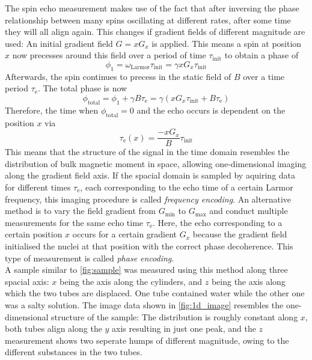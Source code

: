 \documentclass[
    parskip=half, 
    twoside=false,
    twocolumn=true,
    fontsize=11pt,
]{scrarticle}
\begin{document}
The spin echo measurement makes use of the fact that after inversing the phase relationship between many spins oscillating at different rates, after some time they will all align again. This changes if gradient fields of different magnitude are used: An initial gradient field $G = x G_x$ is applied. This means a spin at position $x$ now precesses around this field over a period of time $\tau_\text{init}$ to obtain a phase of
\begin{equation*}
 \phi_1 = \omega_\text{Larmor} \tau_\text{init} = \gamma x G_x \tau_\text{init}
\end{equation*}
Afterwards, the spin continues to precess in the static field of $B$ over a time period $\tau_\text{e}$. The total phase is now
\begin{equation*}
 \phi_\text{total} = \phi_1 + \gamma B \tau_\text{e} = \gamma (x G_x \tau_\text{init} + B \tau_\text{e})
\end{equation*}
Therefore, the time when $\phi_\text{total} = 0$ and the echo occurs is dependent on the position $x$ via
\begin{equation}
 \tau_\text{e}(x) = \frac{-x G_x}{B} \tau_\text{init}
\end{equation}
This means that the structure of the signal in the time domain resembles the distribution of bulk magnetic moment in space, allowing one-dimensional imaging along the gradient field axis. If the spacial domain is sampled by aquiring data for different times $\tau_\text{e}$, each corresponding to the echo time of a certain Larmor frequency, this imaging procedure is called \textit{frequency encoding}. An alternative method is to vary the field gradient from $G_\text{min}$ to $G_\text{max}$ and conduct multiple measurements for the same echo time $\tau_\text{e}$. Here, the echo corresponding to a certain position $x$ occurs for a certain gradient $G_x$ because the gradient field initialised the nuclei at that position with the correct phase decoherence. This type of measurement is called \textit{phase encoding}. \\

A sample similar to \autoref{fig:sample} was measured using this method along three spacial axis: $x$ being the axis along the cylinders, and $z$ being the axis along which the two tubes are displaced. One tube contained water while the other one was a salty solution. The image data shown in \autoref{fig:1d_image} resembles the one-dimensional structure of the sample: The distribution is roughly constant along $x$, both tubes align along the $y$ axis resulting in just one peak, and the $z$ measurement shows two seperate humps of different magnitude, owing to the different substances in the two tubes.\\
\end{document}
